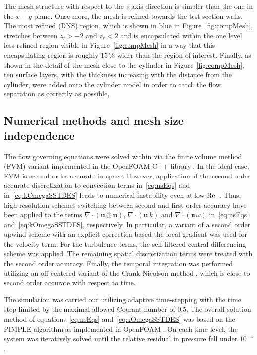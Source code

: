 The mesh structure with respect to the $z$ axis direction is simpler than the one in the $x-y$ plane. Once more, the mesh is refined towards the test section walls. The most refined (DNS) region, which is shown in blue in Figure~\ref{fig:compMesh}, stretches between $z_{r} > -2$ and $z_{r} < 2$ and is encapsulated within the one level less refined region visible in Figure~\ref{fig:compMesh} in a way that this encapsulating region is roughly {$15\,\%$} wider than the region of interest. Finally, as shown in the detail of the mesh close to the cylinder in Figure~\ref{fig:compMesh}, ten surface layers, with the thickness increasing with the distance from the cylinder, were added onto the cylinder model in order to catch the flow separation as correctly as possible, 


\subsection{Numerical methods and mesh size independence}
\label{sub:numerics}
The flow governing equations were solved within {via} the finite volume method (FVM) {variant implemented in the OpenFOAM C++ library \citep{OpenFOAM2007}}. In the ideal case, FVM is second order accurate in space. However, application of the second order accurate discretization to convection terms in~\eqref{eq:nsEqs} and in~\eqref{eq:kOmegaSSTDES} leads to numerical instability even at low $\mathrm{Re}$~\citep{moukalled2016}. Thus, {high-resolution} schemes switching between second and first order accuracy have been applied to the terms $\nabla \cdot \left( \bm{u} \otimes \bm{u}\right)$, $\nabla \cdot \left( \bm{u}\, k\right)$ and $\nabla \cdot \left( \bm{u}\, \omega\right)$ in~\eqref{eq:nsEqs} and~\eqref{eq:kOmegaSSTDES}, respectively. In particular, a variant of a second order upwind scheme with an explicit correction based the local gradient was used for the velocity term. For the turbulence terms, the self-filtered central differencing scheme \citep{zhu1991} was applied. The remaining spatial discretization terms were treated with the second order accuracy. Finally, the temporal integration was performed utilizing an off-centered variant of the Crank-Nicolson method \citep{crankNicolson1947}, which is close to second order accurate with respect to time.

The simulation was carried out utilizing adaptive time-stepping with the time step limited by the maximal allowed Courant number of $0.5$. The overall solution method of equations~\eqref{eq:nsEqs} and~\eqref{eq:kOmegaSSTDES} was based on the PIMPLE algorithm as implemented in OpenFOAM \citep{OpenFOAM2007}. On each time level, the system was iteratively solved until the relative residual in pressure fell under $10^{-4}$.

